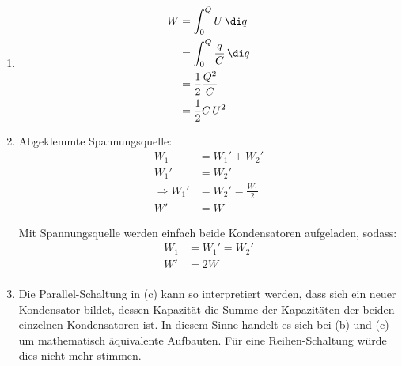 \documentclass[11pt,letterpaper]{article}
\begin{document}
\begin{enumerate}
\begin{enumerate}
            \item
            \begin{align*}
                W &= \int_{0}^{Q} U\,\di q\\
                &= \int_{0}^{Q} \frac{q}{C}\,\di q\\
                &= \frac{1}{2}\frac{Q^2}{C}\\
                &= \frac{1}{2}C\,U^2
            \end{align*}
            
            \item
            Abgeklemmte Spannungsquelle:
            \begin{align*}
                W_1 &= W_1' + W_2'\\
                W_1' &= W_2'\\ 
                \Longrightarrow W_1' &= W_2' = \frac{W_1}{2} \\
                W' &= W
            \end{align*}

            Mit Spannungsquelle werden einfach beide Kondensatoren aufgeladen, sodass:
            \begin{align*}
                W_1 &= W_1' = W_2'\\
                W' &= 2W\\
            \end{align*}

            \item 
            Die Parallel-Schaltung in (c) kann so interpretiert werden, dass
            sich ein neuer Kondensator bildet, dessen Kapazität die Summe der Kapazitäten
            der beiden einzelnen Kondensatoren ist. In diesem Sinne handelt es sich 
            bei (b) und (c) um mathematisch äquivalente Aufbauten. Für eine 
            Reihen-Schaltung würde dies nicht mehr stimmen.

        \end{enumerate}
\end{enumerate}
\end{document}
